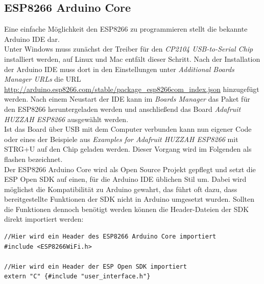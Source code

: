 \subsection{ESP8266 Arduino Core}
Eine einfache Möglichkeit den ESP8266 zu programmieren stellt die bekannte Arduino IDE dar.\\
Unter Windows muss zunächst der Treiber für den \textit{CP2104 USB-to-Serial Chip} installiert werden, auf Linux und Mac entfält dieser Schritt.
Nach der Installation der Arduino IDE muss dort in den Einstellungen unter \textit{Additional Boards Manager URLs} die URL \url{http://arduino.esp8266.com/stable/package_esp8266com_index.json} hinzugefügt werden.  
Nach einem Neustart der IDE kann im \textit{Boards Manager} das Paket für den ESP8266 heruntergeladen werden und anschließend das Board \textit{Adafruit HUZZAH ESP8266} ausgewählt werden. \\
Ist das Board über USB mit dem Computer verbunden kann nun eigener Code oder eines der Beispiele aus \textit{Examples for Adafruit HUZZAH ESP8266} mit STRG+U auf den Chip geladen werden. 
Dieser Vorgang wird im Folgenden als flashen bezeichnet. \\
Der ESP8266 Arduino Core wird als Open Source Projekt gepflegt und setzt die ESP Open SDK auf einen, für die Arduino IDE üblichen Stil um. 
Dabei wird möglichst die Kompatibilität zu Arduino gewahrt, das führt oft dazu, dass bereitgestellte Funktionen der SDK nicht in Arduino umgesetzt wurden.
Sollten die Funktionen dennoch benötigt werden können die Header-Dateien der SDK direkt importiert werden:

\begin{verbatim}
//Hier wird ein Header des ESP8266 Arduino Core importiert
#include <ESP8266WiFi.h> 

//Hier wird ein Header der ESP Open SDK importiert
extern "C" {#include "user_interface.h"} 
\end{verbatim}

